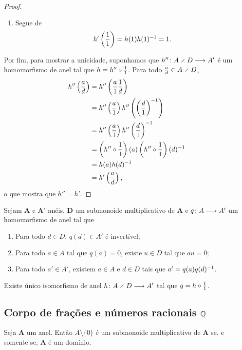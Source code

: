 \begin{proof}
\begin{enumerate}
\begin{enumerate}
		\item Segue de
			\begin{equation*}
			h' \left( \frac{1}{1} \right) = h(1)h(1)^{-1} = 1.
			\end{equation*}
		\end{enumerate}
	\end{enumerate}

Por fim, para mostrar a unicidade, suponhamos que $\fun{h''}{A \olddiv D}{A'}$ é um homomorfismo de anel tal que $h = h'' \circ \frac{\mathrm{I}}{1}$. Para todo $\frac{a}{d} \in A \olddiv D$,
	\begin{align*}
	h'' \left( \frac{a}{d} \right) &= h'' \left( \frac{a}{1}\frac{1}{d} \right) \\
		&= h'' \left( \frac{a}{1} \right) h'' \left( \left( \frac{d}{1} \right)^{-1} \right) \\
		&= h'' \left( \frac{a}{1} \right) h'' \left( \frac{d}{1} \right)^{-1} \\
		&= \left( h'' \circ \frac{\mathrm{I}}{1} \right) (a) \left( h'' \circ \frac{\mathrm{I}}{1} \right) (d)^{-1} \\
		&= h(a)h(d)^{-1} \\
		&= h' \left( \frac{a}{d} \right),
	\end{align*}
o que mostra que $h''=h'$.
\end{proof}

\begin{exercise}
Sejam $\bm A$ e $\bm A'$ anéis, $\bm D$ um submonoide multiplicativo de $\bm A$ e ${q}\colon {A} \longrightarrow {A'}$ um homomorfismo de anel tal que
	\begin{enumerate}
	\item Para todo $d \in D$, $q(d) \in A'$ é invertível;

	\item Para todo $a \in A$ tal que $q(a)=0$, existe $u \in D$ tal que $au=0$;

	\item Para todo $a' \in A'$, existem $a \in A$ e $d \in D$ tais que $a' = q(a)q(d)^{-1}$.
	\end{enumerate}
Existe único isomorfismo de anel $\fun{h}{A \olddiv D}{A'}$ tal que $q = h \circ \frac{\mathrm{I}}{1}$.
\end{exercise}

\subsection{Corpo de frações e números racionais \texorpdfstring{$\mathbb{Q}$}{}}

\begin{exercise}
Seja $\bm A$ um anel. Então $A \setminus \{0\}$ é um submonoide multiplicativo de $\bm A$ se, e somente se, $\bm A$ é um domínio.
\end{exercise}

